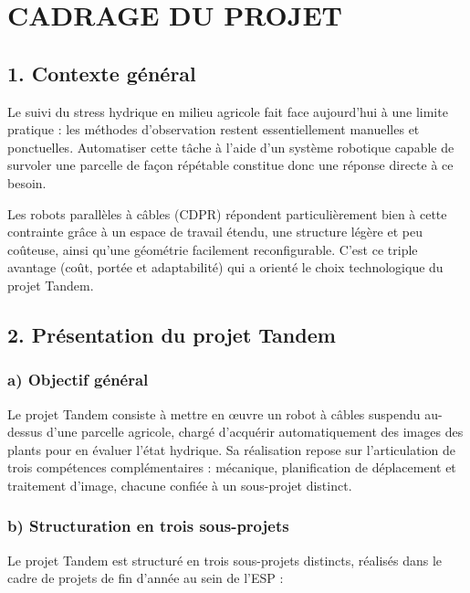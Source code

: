 \chapter*{CADRAGE DU PROJET}
\thispagestyle{plain}

\section*{1. Contexte général}

Le suivi du stress hydrique en milieu agricole fait face aujourd'hui à une limite pratique : les méthodes d'observation restent essentiellement manuelles et ponctuelles. Automatiser cette tâche à l'aide d'un système robotique capable de survoler une parcelle de façon répétable constitue donc une réponse directe à ce besoin.

Les robots parallèles à câbles (CDPR) répondent particulièrement bien à cette contrainte grâce à un espace de travail étendu, une structure légère et peu coûteuse, ainsi qu'une géométrie facilement reconfigurable. C'est ce triple avantage (coût, portée et adaptabilité) qui a orienté le choix technologique du projet Tandem.

\section*{2. Présentation du projet Tandem}

\subsection*{a) Objectif général}

Le projet Tandem consiste à mettre en œuvre un robot à câbles suspendu au-dessus d'une parcelle agricole, chargé d'acquérir automatiquement des images des plants pour en évaluer l'état hydrique. Sa réalisation repose sur l'articulation de trois compétences complémentaires : mécanique, planification de déplacement et traitement d'image, chacune confiée à un sous-projet distinct.

\subsection*{b) Structuration en trois sous-projets}

Le projet Tandem est structuré en trois sous-projets distincts, réalisés dans le cadre de projets de fin d'année au sein de l'ESP :

